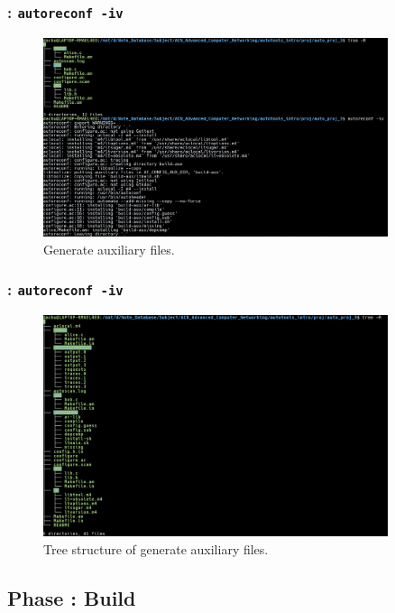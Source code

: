 \begin{frame}
    \frametitle{: \texttt{autoreconf -iv}}

    \begin{figure}[H]
        \centering
        \includegraphics[width=0.9\textwidth]{../figure/autotool_1.png}
        \caption*{Generate auxiliary files.}
    \end{figure}
\end{frame}

\begin{frame}
    \frametitle{: \texttt{autoreconf -iv}}

    \begin{figure}[H]
        \centering
        \includegraphics[width=0.9\textwidth]{../figure/autotool_2.png}
        \caption*{Tree structure of generate auxiliary files.}
    \end{figure}
\end{frame}

\subsection{Phase : Build}

